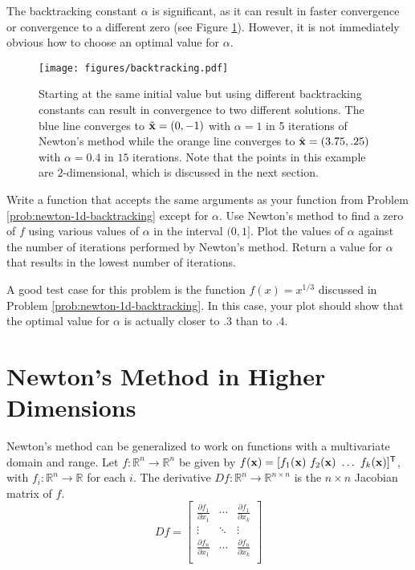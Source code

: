 The backtracking constant $\alpha$ is significant, as it can result in faster convergence or convergence to a different zero (see Figure \ref{fig:newton-backtracking-multi-result}).
However, it is not immediately obvious how to choose an optimal value for $\alpha$.

\begin{figure}[H]
\centering
\texttt{[image: figures/backtracking.pdf]}
\caption{Starting at the same initial value but using different backtracking constants can result in convergence to two different solutions.
The blue line converges to $\tilde{\mathbf{x}} = (0,-1)$ with $\alpha = 1$ in 5 iterations of Newton's method while the orange line converges to $\hat{\mathbf{x}} = (3.75,.25)$ with $\alpha = 0.4$ in $15$ iterations.
Note that the points in this example are $2$-dimensional, which is discussed in the next section.}
\label{fig:newton-backtracking-multi-result}
\end{figure}

\begin{problem} %
\label{prob:newton-backtracking-search}
Write a function that accepts the same arguments as your function from Problem \ref{prob:newton-1d-backtracking} except for $\alpha$.
Use Newton's method to find a zero of $f$ using various values of $\alpha$ in the interval $(0,1]$.
Plot the values of $\alpha$ against the number of iterations performed by Newton's method.
Return a value for $\alpha$ that results in the lowest number of iterations.

A good test case for this problem is the function $f(x) = x^{1/3}$ discussed in Problem \ref{prob:newton-1d-backtracking}.
In this case, your plot should show that the optimal value for $\alpha$ is actually closer to $.3$ than to $.4$.
\end{problem}

\section*{Newton's Method in Higher Dimensions} %

Newton's method can be generalized to work on functions with a multivariate domain and range.
Let $f:\mathbb{R}^n\rightarrow\mathbb{R}^n$ be given by $f(\x)=[f_1(\x)\ f_2(\x)\ \ldots\ f_k(\x)]\trp$, with $f_i:\mathbb{R}^n\to\mathbb{R}$ for each $i$.
The derivative $Df:\mathbb{R}^n\rightarrow\mathbb{R}^{n\times n}$ is the $n\times n$ Jacobian matrix of $f$.
\[
Df =
\left[\begin{array}{ccc}
\frac{\partial f_1}{\partial x_1} & \cdots & \frac{\partial f_1}{\partial x_k} \\
\vdots & \ddots & \vdots \\
\frac{\partial f_n}{\partial x_1} & \cdots & \frac{\partial f_n}{\partial x_k} \\
\end{array}\right]
\]

